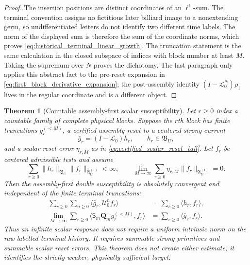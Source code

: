 \documentclass[11pt]{amsart}
\theoremstyle{compactplain}
\newtheorem{theorem}{Theorem}[section]
\theoremstyle{compactdefinition}
\theoremstyle{compactremark}
\newcommand{\Ltransfer}{\mathscr L}
\begin{document}
\begin{proof}
The insertion positions are distinct coordinates of an \(\ell^1\)-sum.
The terminal convention assigns no fictitious later billiard image to a
nonextending germ, so undifferentiated letters do not identify two different
time labels.  The norm of the displayed sum is therefore the sum of the
coordinate norms, which proves
\eqref{eq:historical_terminal_linear_growth}.  The truncation statement is
the same calculation in the closed subspace of indices with block number at
least \(M\).  Taking the supremum over \(N\) proves the dichotomy.  The last
paragraph only applies this abstract fact to the pre-reset expansion in
\eqref{eq:first_block_derivative_expansion}; the post-assembly identity
\((I-\Ltransfer_0^N)\rho_1\) lives in the regular coordinate and is a
different object.
\end{proof}

\begin{theorem}[Countable assembly-first scalar susceptibility]
\label{thm:countable_assembly_first_susceptibility}
Let \(r\ge0\) index a countable family of complete physical blocks.  Suppose
the \(r\)th block has finite truncations \(g_r^{(<M)}\), a certified assembly
reset to a centered strong current
\[
 \bar g_r=(I-\Ltransfer_0)h_r,
 \qquad h_r\in\mathfrak B_U,
\]
and a scalar reset error \(\eta_{r,M}\) as in
\eqref{eq:certified_scalar_reset_tail}.  Let \(f_r\) be centered admissible
tests and assume
\begin{equation}
\label{eq:countable_reset_summability}
 \sum_{r\ge0}\|h_r\|_{\mathfrak B_U}
                    \|f_r\|_{\mathfrak A_U^{(1)}}<\infty,
 \qquad
 \lim_{M\to\infty}\sum_{r\ge0}
        \eta_{r,M}\|f_r\|_{\mathfrak A_U^{(1)}}=0.
\end{equation}
Then the assembly-first double susceptibility is absolutely convergent and
independent of the finite terminal truncations:
\begin{align}
\label{eq:countable_assembly_first_identity}
 \sum_{r\ge0}\sum_{n\ge0}
   \langle\bar g_r,\mathscr U_0^nf_r\rangle
 &=\sum_{r\ge0}\langle h_r,f_r\rangle,\\
 \lim_{M\to\infty}\sum_{r\ge0}
   \langle\mathsf S_m\mathbf Q_mg_r^{(<M)},f_r\rangle
 &=\sum_{r\ge0}\langle\bar g_r,f_r\rangle.
\end{align}
Thus an infinite scalar response does not require a uniform intrinsic norm on
the raw labelled terminal history.  It requires summable strong primitives
and summable scalar reset errors.  This theorem does not create either
estimate; it identifies the strictly weaker, physically sufficient target.
\end{theorem}
\end{document}
